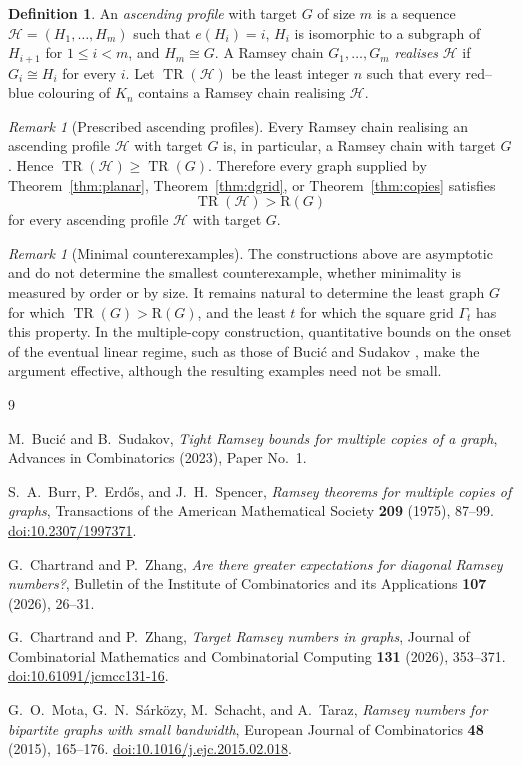 \documentclass[11pt,reqno]{amsart}
\theoremstyle{plain}
\theoremstyle{definition}
\newtheorem{definition}[theorem]{Definition}
\theoremstyle{remark}
\newtheorem{remark}[theorem]{Remark}
\DeclareMathOperator{\TR}{TR}
\newcommand{\R}{\mathrm{R}}
\begin{document}
\begin{definition}
An \emph{ascending profile} with target $G$ of size $m$ is a sequence $\mathcal{H} = (H_1, \ldots, H_m)$ such that $e(H_i) = i$, $H_i$ is isomorphic to a subgraph of $H_{i+1}$ for $1 \leq i < m$, and $H_m \cong G$. A Ramsey chain $G_1, \ldots, G_m$ \emph{realises} $\mathcal{H}$ if $G_i \cong H_i$ for every $i$. Let $\TR(\mathcal{H})$ be the least integer $n$ such that every red--blue colouring of $K_n$ contains a Ramsey chain realising $\mathcal{H}$.
\end{definition}

\begin{remark}[Prescribed ascending profiles]
Every Ramsey chain realising an ascending profile $\mathcal{H}$ with target $G$ is, in particular, a Ramsey chain with target $G$. Hence $\TR(\mathcal{H}) \geq \TR(G)$. Therefore every graph supplied by Theorem~\ref{thm:planar}, Theorem~\ref{thm:dgrid}, or Theorem~\ref{thm:copies} satisfies
\[
\TR(\mathcal{H}) > \R(G)
\]
for every ascending profile $\mathcal{H}$ with target $G$.
\end{remark}

\begin{remark}[Minimal counterexamples]
The constructions above are asymptotic and do not determine the smallest counterexample, whether minimality is measured by order or by size. It remains natural to determine the least graph $G$ for which $\TR(G) > \R(G)$, and the least $t$ for which the square grid $\Gamma_t$ has this property. In the multiple-copy construction, quantitative bounds on the onset of the eventual linear regime, such as those of Buci\'c and Sudakov \cite{BS}, make the argument effective, although the resulting examples need not be small.
\end{remark}

\begin{thebibliography}{9}

M.~Buci\'c and B.~Sudakov,
\emph{Tight Ramsey bounds for multiple copies of a graph},
Advances in Combinatorics (2023), Paper No.~1.

S.~A.~Burr, P.~Erd\H{o}s, and J.~H.~Spencer,
\emph{Ramsey theorems for multiple copies of graphs},
Transactions of the American Mathematical Society \textbf{209} (1975), 87--99.
\href{https://doi.org/10.2307/1997371}{doi:10.2307/1997371}.

G.~Chartrand and P.~Zhang,
\emph{Are there greater expectations for diagonal Ramsey numbers?},
Bulletin of the Institute of Combinatorics and its Applications \textbf{107} (2026), 26--31.

G.~Chartrand and P.~Zhang,
\emph{Target Ramsey numbers in graphs},
Journal of Combinatorial Mathematics and Combinatorial Computing \textbf{131} (2026), 353--371.
\href{https://doi.org/10.61091/jcmcc131-16}{doi:10.61091/jcmcc131-16}.

G.~O.~Mota, G.~N.~S\'ark\"ozy, M.~Schacht, and A.~Taraz,
\emph{Ramsey numbers for bipartite graphs with small bandwidth},
European Journal of Combinatorics \textbf{48} (2015), 165--176.
\href{https://doi.org/10.1016/j.ejc.2015.02.018}{doi:10.1016/j.ejc.2015.02.018}.

\end{thebibliography}
\end{document}
